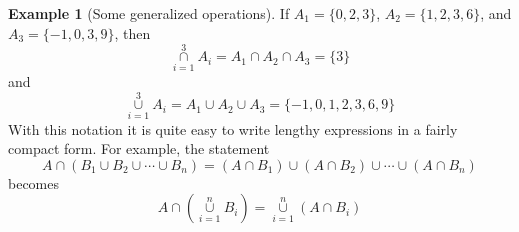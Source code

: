 \documentclass[10pt,]{book}
\theoremstyle{plain}
\theoremstyle{definition}
\theoremstyle{definition}
\theoremstyle{definition}
\newtheorem{example}[theorem]{Example}
\theoremstyle{definition}
\begin{document}
\begin{example}[Some generalized operations]\label{some_generalized_operations}
If \(A_1 = \{0, 2, 3\}\), \(A_2 = \{1, 2, 3, 6\}\), and \(A_3 = \{-1, 0, 3, 9\}\), then 
 \begin{equation*}\underset{i=1}{\overset{3}{\cap }}A_i=A_1\cap A_2\cap A_3=\{3\}\end{equation*}
and
\begin{equation*}\underset{i=1}{\overset{3}{\cup }}A_i=A_1\cup A_2\cup A_3=\{-1,0,1,2,3,6,9\}\end{equation*}
With this notation it is quite easy to write lengthy expressions in a fairly compact form. For example, the statement 
    \begin{equation*}A\cap \left(B_1\cup B_2\cup \cdots \cup B_n\right)= \left(A\cap B_1\right)\cup \left(A\cap B_2\right)\cup \cdots \cup \left(A\cap
B_n\right)\end{equation*}
becomes 
   \begin{equation*}A \cap \left(\underset{i=1}{\overset{n}{\cup }}B_i\right)= \underset{i=1}{\overset{n}{\cup }}\left(A\cap B_i\right)\end{equation*}%
\end{example}
\typeout{************************************************}
\typeout{************************************************}
\end{document}
